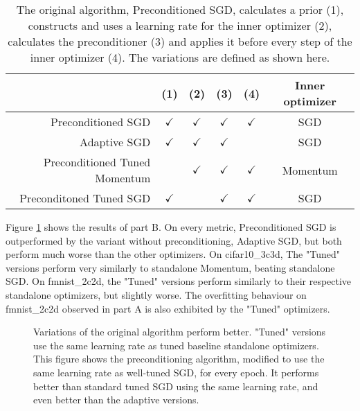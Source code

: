\documentclass[twoside,12pt,a4paper]{report}
\begin{document}
\begin{table}[h]
	\centering
	\begin{tabular}{|r||c|c|c|c|c|}
		\hline 
		& (1) & (2) & (3) & (4) & Inner optimizer\\ 
		\hline 
		Preconditioned SGD & $\checkmark$ & $\checkmark$& $\checkmark$ & $\checkmark$ & SGD \\ 
		\hline 
		Adaptive SGD & $\checkmark$ & $\checkmark$ & $\checkmark$ & & SGD \\ 
		\hline 
		Preconditioned Tuned Momentum &  & $\checkmark$ & $\checkmark$ & $\checkmark$ & Momentum \\ 
		\hline 
		Preconditoned Tuned SGD & $\checkmark$ &  & $\checkmark$ & $\checkmark$ & SGD \\ 
		\hline 
	\end{tabular}
	\caption{The original algorithm, Preconditioned SGD, calculates a prior (1), constructs and uses a learning rate for the inner optimizer (2), calculates the preconditioner (3) and applies it before every step of the inner optimizer (4). The variations are defined as shown here.}
	\label{tab:exp_tunedalpha}
\end{table}

Figure \ref{fig:exp_tunedalpha} shows the results of part B. 
On every metric, Preconditioned SGD is outperformed by the variant without preconditioning, Adaptive SGD, but both perform much worse than the other optimizers.
On cifar10\_3c3d, The "Tuned" versions perform very similarly to standalone Momentum, beating standalone SGD. On fmnist\_2c2d, the "Tuned" versions perform similarly to their respective standalone optimizers, but slightly worse.
The overfitting behaviour on fmnist\_2c2d observed in part A is also exhibited by the "Tuned" optimizers.
\begin{figure}
		
		\caption{Variations of the original algorithm perform better. "Tuned" versions use the same learning rate as tuned baseline standalone optimizers.
			This figure shows the preconditioning algorithm, modified to use the same learning rate as well-tuned SGD, for every epoch. It performs better than standard tuned SGD using the same learning rate, and even better than the adaptive versions.}
		\label{fig:exp_tunedalpha}
\end{figure}
\end{document}
